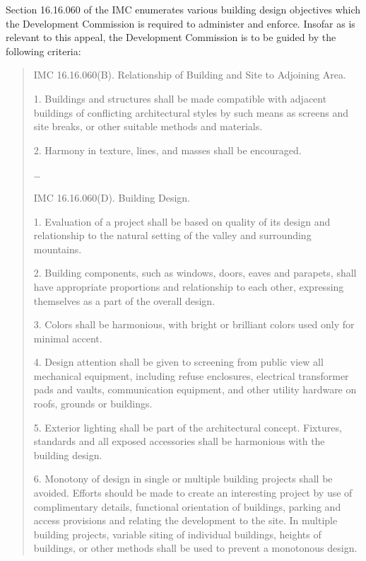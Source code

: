 Section 16.16.060 of the IMC enumerates various building design objectives which
the Development Commission is required to administer and enforce. Insofar as is
relevant to this appeal, the Development Commission is to be guided by the
following criteria:
\begin{quotation}
\noindent IMC 16.16.060(B). Relationship of Building and Site to Adjoining Area.

1. Buildings and structures shall be made compatible with adjacent buildings
of conflicting architectural styles by such means as screens and site breaks, or
other suitable methods and materials.

2. Harmony in texture, lines, and masses shall be encouraged.

\ldots

\noindent IMC 16.16.060(D). Building Design.

1. Evaluation of a project shall be based on quality of its design and
relationship to the natural setting of the valley and surrounding mountains.

2. Building components, such as windows, doors, eaves and parapets, shall
have appropriate proportions and relationship to each other, expressing
themselves as a part of the overall design.

3. Colors shall be harmonious, with bright or brilliant colors used only for
minimal accent.

4. Design attention shall be given to screening from public view all
mechanical equipment, including refuse enclosures, electrical transformer pads
and vaults, communication equipment, and other utility hardware on roofs,
grounds or buildings.

5. Exterior lighting shall be part of the architectural concept. Fixtures,
standards and all exposed accessories shall be harmonious with the building
design.

6. Monotony of design in single or multiple building projects shall be
avoided. Efforts should be made to create an interesting project by use of
complimentary details, functional orientation of buildings, parking and access
provisions and relating the development to the site. In multiple building
projects, variable siting of individual buildings, heights of buildings, or
other methods shall be used to prevent a monotonous design.
\end{quotation}

